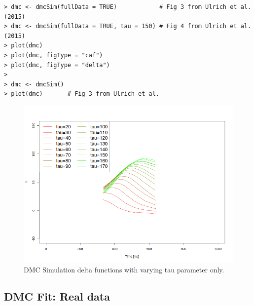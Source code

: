 \begin{minipage}{\linewidth}
    \begin{lstlisting}[style = R, title = {R Code Example 2}, captionpos = t]
> dmc <- dmcSim(fullData = TRUE)            # Fig 3 from Ulrich et al. (2015)
> dmc <- dmcSim(fullData = TRUE, tau = 150) # Fig 4 from Ulrich et al. (2015)
> plot(dmc)
> plot(dmc, figType = "caf")    
> plot(dmc, figType = "delta")
> 
> dmc <- dmcSim() 
> plot(dmc)       # Fig 3 from Ulrich et al. 

    \end{lstlisting}
\end{minipage}

\begin{figure}
    \includegraphics[width=1\textwidth]{../figures/figure4.png}
    \caption{DMC Simulation delta functions with varying tau parameter only.}
    \label{fig:2}
\end{figure}

\subsection{DMC Fit: Real data} 
\label{dmc_fit} 

